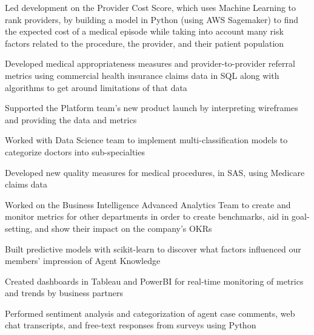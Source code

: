 \documentclass[a4paper]{deedy-resume-openfont} %
\begin{document}
\begin{minipage}[t]{0.66\textwidth}
\begin{tightitemize}
	\item Led development on the Provider Cost Score, which uses Machine Learning to rank providers, by building a model in Python (using AWS Sagemaker) to find the expected cost of a medical episode while taking into account many risk factors related to the procedure, the provider, and their patient population%
	\item Developed medical appropriateness measures and provider-to-provider referral metrics using commercial health insurance claims data in SQL along with algorithms to get around limitations of that data
	\item Supported the Platform team's new product launch by interpreting wireframes and providing the data and metrics
	\item Worked with Data Science team to implement multi-classification models to categorize doctors into sub-specialties
	\item Developed new quality measures for medical procedures, in SAS, using Medicare claims data
\end{tightitemize}

\descript{}
\begin{tightitemize}
	\item Worked on the Business Intelligence Advanced Analytics Team to create and monitor metrics for other departments in order to create benchmarks, aid in goal-setting, and show their impact on the company's OKRs
	\item Built predictive models with scikit-learn to discover what factors influenced our members' impression of Agent Knowledge
	\item  Created dashboards in Tableau and PowerBI for real-time monitoring of metrics and trends by business partners
	\item Performed sentiment analysis and categorization of agent case comments, web chat transcripts, and free-text responses from surveys using Python
\end{tightitemize}



\end{minipage}
\end{document}
